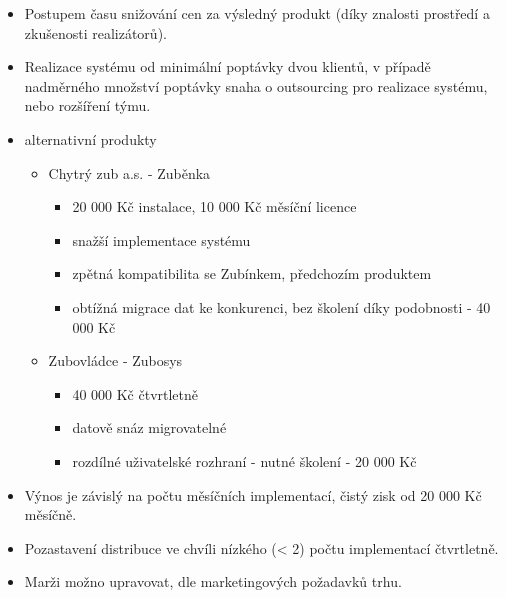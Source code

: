\documentclass[11pt, a4paper, titlepage]{article}
\begin{document}
		\begin{itemize}
			\item Postupem času snižování cen za výsledný produkt (díky znalosti prostředí a zkušenosti realizátorů).
			\item Realizace systému od minimální poptávky dvou klientů, v případě nadměrného množství poptávky snaha o outsourcing pro realizace systému, nebo rozšíření týmu.
			\item alternativní produkty
			\begin{itemize}
				\item Chytrý zub a.s. - Zuběnka
				\begin{itemize}
					\item 20 000 Kč instalace, 10 000 Kč měsíční licence
					\item snažší implementace systému
					\item zpětná kompatibilita se Zubínkem, předchozím produktem
					\item obtížná migrace dat ke konkurenci, bez školení díky podobnosti - 40 000 Kč
				\end{itemize}
				\item Zubovládce - Zubosys
				\begin{itemize}
					\item 40 000 Kč čtvrtletně
					\item datově snáz migrovatelné
					\item rozdílné uživatelské rozhraní - nutné školení - 20 000 Kč
				\end{itemize}
			\end{itemize}
			\item Výnos je závislý na počtu měsíčních implementací, čistý zisk od 20 000 Kč měsíčně.
			\item Pozastavení distribuce ve chvíli nízkého (< 2) počtu implementací čtvrtletně.
			\item Marži možno upravovat, dle marketingových požadavků trhu.
		\end{itemize}
		
\end{document}
